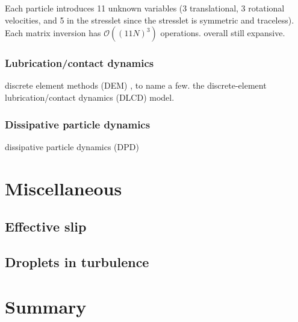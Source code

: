Each particle introduces 11 unknown variables (3 translational, 3 rotational velocities, and 5 in the stresslet since the stresslet is symmetric and traceless).
Each matrix inversion has $\mathcal{O}((11N)^3)$ operations.
overall still expansive.


\subsection{Lubrication/contact dynamics}


discrete element methods (DEM) \citep{Mari_Seto_2014JoR, Cheal_Ness_2018}, to name a few.
 the discrete-element lubrication/contact dynamics (DLCD) model.



\subsection{Dissipative particle dynamics}

dissipative particle dynamics (DPD) \citep{Hoogerbrugge_1992, Groot_Warren_1997}



\chapter{Miscellaneous}

\section{Effective slip}

\section{Droplets in turbulence}


\chapter{Summary}






